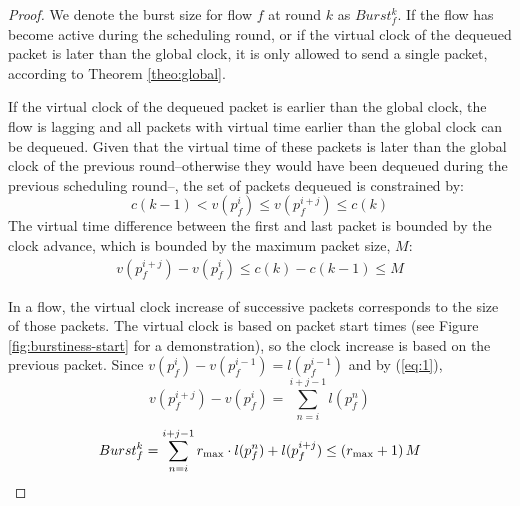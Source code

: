 \begin{proof}
We denote the burst size for flow $f$ at round $k$ as $Burst_f^k$.
If the flow has become active during the scheduling round, or if the virtual clock of the dequeued packet is later than the global clock, it is only allowed to send a single packet, according to Theorem \ref{theo:global}.

If the virtual clock of the dequeued packet is earlier than the global clock, the flow is lagging and all packets with virtual time earlier than the global clock can be dequeued. Given that the virtual time of these packets is later than the global clock of the previous round--otherwise they would have been dequeued during the previous scheduling round--, the set of packets dequeued is constrained by:
$$ c(k-1) < v(p_f^i) \leq v(p_f^{i+j}) \leq c(k) $$
The virtual time difference between the first and last packet is bounded by the clock advance, which is bounded by the maximum packet size, $M$:
\begin{align}
    v(p_f^{i+j}) - v(p_f^i) \leq c(k) - c(k-1) \leq M \label{eq:1}
\end{align}

In a flow, the virtual clock increase of successive packets corresponds to the size of those packets. The virtual clock is based on packet start times (see Figure \ref{fig:burstiness-start} for a demonstration), so the clock increase is based on the previous packet. Since $v(p_f^i) - v(p_f^{i-1}) = l(p_f^{i-1})$ and by (\ref{eq:1}),
$$ v(p_f^{i+j}) - v(p_f^i) = \sum_{n=i}^{i+j-1} l(p_f^{n}) $$
$$ Burst^{k}_f = \sum_{n=i}^{i+j-1} r_{\max} \cdot l(p_f^{n}) + l(p_f^{i+j}) \leq \left( r_{\max} + 1 \right)M  \qedhere$$

\end{proof}




